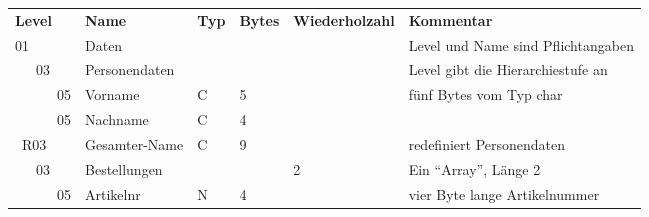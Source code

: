 \begin{tabularx}{\textwidth}{llllll}
\textbf{Level}  & \textbf{Name} & \textbf{Typ} & \textbf{Bytes} & \textbf{Wiederholzahl} & \textbf{Kommentar} \\
01 & Daten & & & & Level und Name sind Pflichtangaben\\
\ \ \ 03 & Personendaten & & & & Level gibt die Hierarchiestufe an\\
\ \ \ \ \ \ 05 & Vorname & C & 5 & & fünf Bytes vom Typ char\\
\ \ \ \ \ \ 05 & Nachname & C & 4 & &\\
\ R03 & Gesamter-Name & C & 9 & & redefiniert Personendaten\\
\ \ \ 03 & Bestellungen & & & 2 & Ein ``Array'', Länge 2\\
\ \ \ \ \ \ 05 & Artikelnr & N & 4 & & vier Byte lange Artikelnummer\\
\end{tabularx}
     
     
